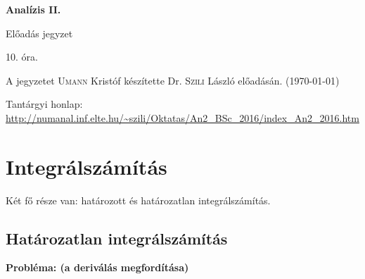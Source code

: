\documentclass[a4paper,11.5pt]{article}
\begin{document}
	\setlength\parindent{0pt}
	\def\s{\hspace{0.2mm}\vphantom{\beta}}
	\def\Z{\mathbb{Z}}
	\def\Q{\mathbb{Q}}
	\def\R{\mathbb{R}}
	\def\C{\mathbb{C}}
	\def\N{\mathbb{N}}
	\def\Ra{\overline{\mathbb{R}}}
	
	\def\sume{\displaystyle\sum_{n=1}^{+\infty}}
	\def\sumn{\displaystyle\sum_{n=0}^{+\infty}}
	
	\def\narrow{\underset{n\rightarrow+\infty}{\longrightarrow}}
	\def\limn{\displaystyle\lim_{n\to +\infty}}
	\def\limx{\displaystyle\lim_{x\to +\infty}}
	
	
	\theoremstyle{definition}
	\newtheorem{theorem}{Tétel}[subsection] 
	
	\theoremstyle{definition}
	\newtheorem{definition}[theorem]{Definíció} 
	\newtheorem{example}[theorem]{Példa} 
	\newtheorem{task}[theorem]{Feladat} 
	\newtheorem{note}[theorem]{Megjegyzés}
	\newtheorem{revision}[theorem]{Emlékeztető}
	\begin{center}
		{\LARGE\textbf{Analízis II.}}
		
		{\Large Előadás jegyzet}
		
		10. óra.
	\end{center}
	A jegyzetet \textsc{Umann} Kristóf készítette Dr. \textsc{Szili} László  előadásán. (\today)
	
	
	Tantárgyi honlap: \url{http://numanal.inf.elte.hu/~szili/Oktatas/An2_BSc_2016/index_An2_2016.htm}
	\section{Integrálszámítás}
	Két fő része van: határozott és határozatlan integrálszámítás.
	\subsection{Határozatlan integrálszámítás}
	
	\textbf{Probléma: (a deriválás megfordítása)}
	
\end{document}

